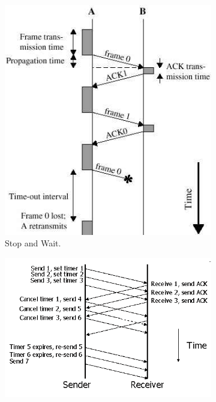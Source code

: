 \documentclass[frenchb]{article}
\begin{document}
\begin{figure}[H]
\centering
\begin{subfigure}{.5\textwidth}
  \centering
  \includegraphics[width=\linewidth]{img/arq1.png}
  \caption{Stop and Wait.}
  \label{fig:sub1}         
\end{subfigure}%
\begin{subfigure}{.5\textwidth}
  \centering
  \vspace*{2.7cm}
  \includegraphics[width=\linewidth]{img/arq2.png}

\end{subfigure}
\end{figure}
\end{document}
